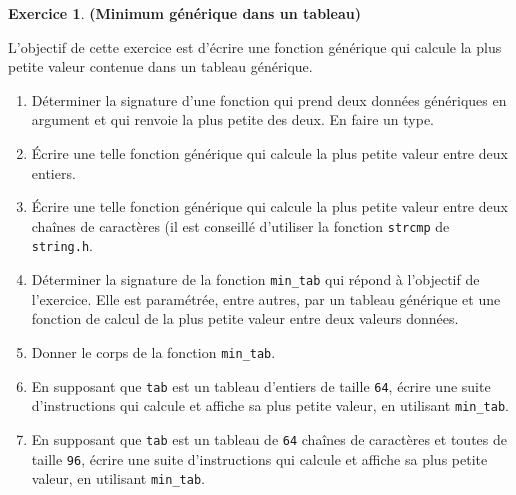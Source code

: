 \documentclass[12pt]{article}
\theoremstyle{definition}
\newtheorem{Exercice}{Exercice}
\begin{document}
\begin{Exercice} {\bf (Minimum générique dans un tableau)}\smallskip

L'objectif de cette exercice est d'écrire une fonction générique qui
calcule la plus petite valeur contenue dans un tableau générique.
\begin{enumerate}
    \item Déterminer la signature d'une fonction qui prend deux données
    génériques en argument et qui renvoie la plus petite des deux. En
    faire un type.
    \smallskip

    \item Écrire une telle fonction générique qui calcule la plus petite
    valeur entre deux entiers.
    \smallskip

    \item Écrire une telle fonction générique qui calcule la plus petite
    valeur entre deux chaînes de caractères (il est conseillé d'utiliser
    la fonction {\tt strcmp} de {\tt string.h}.
    \smallskip

    \item Déterminer la signature de la fonction {\tt min\_tab} qui
    répond à l'objectif de l'exercice. Elle est paramétrée, entre autres,
    par un tableau générique et une fonction de calcul de la plus petite
    valeur entre deux valeurs données.
    \smallskip

    \item Donner le corps de la fonction {\tt min\_tab}.
    \smallskip

    \item En supposant que {\tt tab} est un tableau d'entiers de taille
    {\tt 64}, écrire une suite d'instructions qui calcule et affiche
    sa plus petite valeur, en utilisant {\tt min\_tab}.
    \smallskip

    \item En supposant que {\tt tab} est un tableau de {\tt 64} chaînes
    de caractères et toutes de taille {\tt 96}, écrire une suite
    d'instructions qui calcule et affiche sa plus petite valeur, en
    utilisant {\tt min\_tab}.
\end{enumerate}
\end{Exercice}
\bigskip
\end{document}
